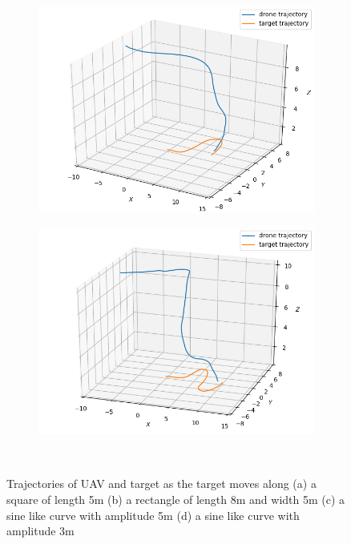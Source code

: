 \documentclass[conf]{new-aiaa}
\begin{document}
\begin{figure}[h]
\begin{subfigure}{0.5\textwidth}
    \caption{} \label{fig:tight_square_coord}
  \end{subfigure}%
  \hspace*{\fill}   %
  \\
  \begin{subfigure}{0.5\textwidth}
    \includegraphics[width=\linewidth]{oscillate_coord.png}
    \caption{} \label{fig:oscillate_coord}
  \end{subfigure}%
  \hspace*{\fill}   %
  \begin{subfigure}{0.5\textwidth}
    \includegraphics[width=\linewidth]{oscillate_coord_3.png}
    \caption{} \label{fig:oscillate_coord_3}
  \end{subfigure}%
  \hspace*{\fill}   %
  \\
\caption{Trajectories of UAV and target as the target moves along (a) a square of length 5m (b) a rectangle of length 8m and width 5m (c) a sine like curve with amplitude 5m (d) a sine like curve with amplitude 3m} \label{fig:Coordination_curve}
\end{figure}
\end{document}
